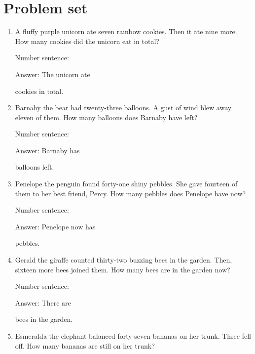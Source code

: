 \documentclass{tufte-book}
\begin{document}
\clearpage\section{Problem set }

\begin{enumerate}

\item
  A fluffy purple unicorn ate seven rainbow cookies. Then it ate nine
  more. How many cookies did the unicorn eat in total?\medskip\par
  Number sentence:
  \dotfill\medskip\par
  Answer: The unicorn ate
  \dotfill\medskip\par\mbox{}\dotfill\medskip\par\mbox{}\dotfill\bigskip
  cookies in total.
\item
  Barnaby the bear had twenty-three balloons. A gust of wind blew away
  eleven of them. How many balloons does Barnaby have left?\medskip\par
  Number sentence:
  \dotfill\medskip\par
  Answer: Barnaby has
  \dotfill\medskip\par\mbox{}\dotfill\medskip\par\mbox{}\dotfill\bigskip
  balloons left.
\item
  Penelope the penguin found forty-one shiny pebbles. She gave fourteen
  of them to her best friend, Percy. How many pebbles does Penelope have
  now?\medskip\par
  Number sentence:
  \dotfill\medskip\par
  Answer: Penelope now has
  \dotfill\medskip\par\mbox{}\dotfill\medskip\par\mbox{}\dotfill\bigskip
  pebbles.
\item
  Gerald the giraffe counted thirty-two buzzing bees in the garden.
  Then, sixteen more bees joined them. How many bees are in the garden
  now?\medskip\par
  Number sentence:
  \dotfill\medskip\par
  Answer: There are
  \dotfill\medskip\par\mbox{}\dotfill\medskip\par\mbox{}\dotfill\bigskip
  bees in the garden.
\item
  Esmeralda the elephant balanced forty-seven bananas on her trunk.
  Three fell off. How many bananas are still on her trunk?\medskip\par

\end{enumerate}
\end{document}

